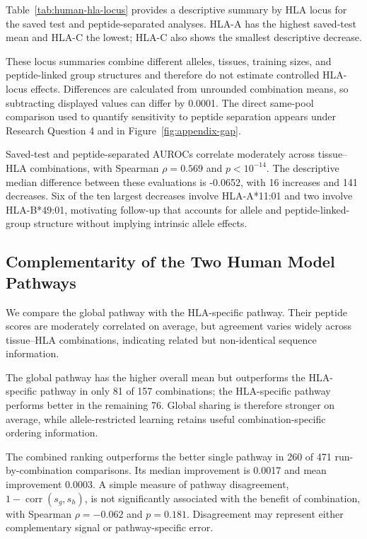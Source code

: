 Table~\ref{tab:human-hla-locus} provides a descriptive summary by HLA locus for the saved test and peptide-separated analyses. HLA-A has the highest saved-test mean and HLA-C the lowest; HLA-C also shows the smallest descriptive decrease.

These locus summaries combine different alleles, tissues, training sizes, and peptide-linked group structures and therefore do not estimate controlled HLA-locus effects. Differences are calculated from unrounded combination means, so subtracting displayed values can differ by 0.0001. The direct same-pool comparison used to quantify sensitivity to peptide separation appears under Research Question 4 and in Figure~\ref{fig:appendix-gap}.

Saved-test and peptide-separated AUROCs correlate moderately across tissue--HLA combinations, with Spearman \(\rho=0.569\) and \(p<10^{-14}\). The descriptive median difference between these evaluations is -0.0652, with 16 increases and 141 decreases. Six of the ten largest decreases involve HLA-A*11:01 and two involve HLA-B*49:01, motivating follow-up that accounts for allele and peptide-linked-group structure without implying intrinsic allele effects.

\subsection{Complementarity of the Two Human Model Pathways}

We compare the global pathway with the HLA-specific pathway. Their peptide scores are moderately correlated on average, but agreement varies widely across tissue--HLA combinations, indicating related but non-identical sequence information.

The global pathway has the higher overall mean but outperforms the HLA-specific pathway in only 81 of 157 combinations; the HLA-specific pathway performs better in the remaining 76. Global sharing is therefore stronger on average, while allele-restricted learning retains useful combination-specific ordering information.

The combined ranking outperforms the better single pathway in 260 of 471 run-by-combination comparisons. Its median improvement is 0.0017 and mean improvement 0.0003. A simple measure of pathway disagreement, \(1-\operatorname{corr}(s_g,s_h)\), is not significantly associated with the benefit of combination, with Spearman \(\rho=-0.062\) and \(p=0.181\). Disagreement may represent either complementary signal or pathway-specific error.

